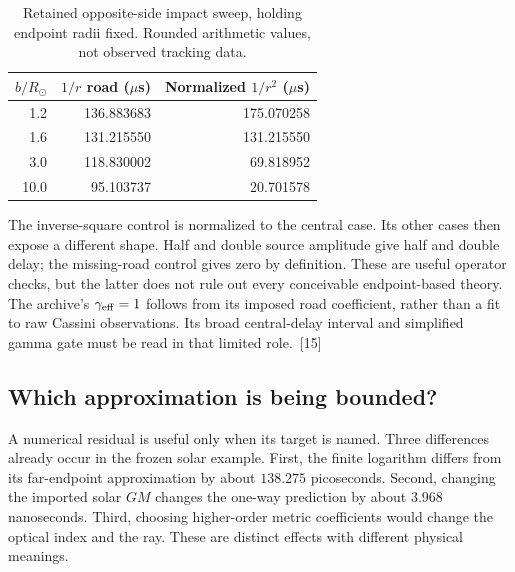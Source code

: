 \documentclass[10pt,twocolumn,letterpaper]{article}
\begin{document}
\begin{table}[htbp]
\centering\small
\caption{Retained opposite-side impact sweep, holding endpoint radii fixed. Rounded arithmetic values, not observed tracking data.}
\begin{tabular}{@{}rrr@{}}\toprule
$b/R_\odot$ & $1/r$ road ($\mu$s) & Normalized $1/r^2$ ($\mu$s)\\\midrule
1.2 & 136.883683 &175.070258\\
1.6 & 131.215550 &131.215550\\
3.0 & 118.830002 &69.818952\\
10.0 &95.103737 &20.701578\\\bottomrule
\end{tabular}
\end{table}
The inverse-square control is normalized to the central case. Its other cases then expose a different shape. Half and double source amplitude give half and double delay; the missing-road control gives zero by definition. These are useful operator checks, but the latter does not rule out every conceivable endpoint-based theory. The archive's $\gamma_{\rm eff}=1$ follows from its imposed road coefficient, rather than a fit to raw Cassini observations. Its broad central-delay interval and simplified gamma gate must be read in that limited role.~[15]


\subsection{Which approximation is being bounded?}
A numerical residual is useful only when its target is named. Three differences already occur in the frozen solar example. First, the finite logarithm differs from its far-endpoint approximation by about $138.275$ picoseconds. Second, changing the imported solar $GM$ changes the one-way prediction by about $3.968$ nanoseconds. Third, choosing higher-order metric coefficients would change the optical index and the ray. These are distinct effects with different physical meanings.
\end{document}
